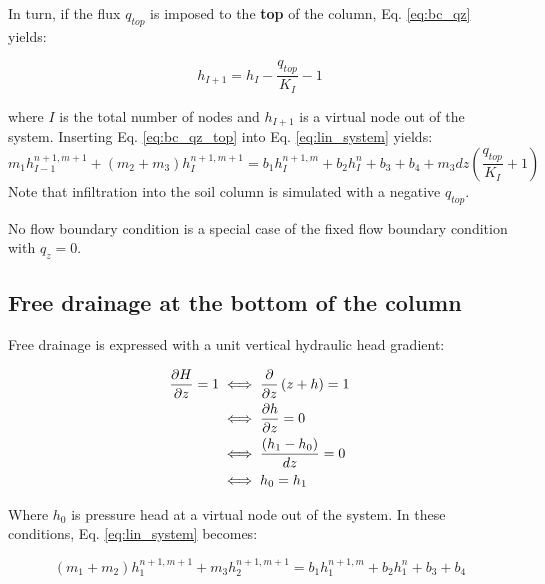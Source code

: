 \documentclass[a4paper,12pt]{article}
\begin{document}
In turn, if the flux $q_{top}$ is imposed to the \textbf{top} of the column, Eq. \ref{eq:bc_qz} yields:

\begin{equation}
    h_{I+1}  = h_I  - \frac{q_{top}}{K_I} - 1
    \label{eq:bc_qz_top}
\end{equation}

where $I$ is the total number of nodes and $h_{I+1}$ is a virtual node out of the system. Inserting Eq. \ref{eq:bc_qz_top} into Eq. \ref{eq:lin_system} yields: 
\begin{equation}
    m_1 h_{I-1}^{n+1,m+1} + (m_2 + m_3) h_I^{n+1,m+1} = b_1 h_I^{n+1,m} + b_2 h_I^n + b_3 + b_4 + m_3 dz \left( \frac{q_{top}}{K_I} +1 \right)
    \label{eq:bc_qz_lin_system_top}
\end{equation}
Note that infiltration into the soil column is simulated with a negative $q_{top}$.


No flow boundary condition is a special case of the fixed flow boundary condition with $q_z = 0$.


\subsection{Free drainage at the bottom of the column}

Free drainage is expressed with a unit vertical hydraulic head gradient: 

\begin{align}
    \frac{\partial H}{\partial z} = 1 &\iff \frac{\partial}{\partial z} \left( z + h \right) =1 \nonumber \\
				      &\iff \frac{\partial h}{\partial z} = 0 \nonumber \\
				      &\iff {\left( h_1 - h_0 \right) \over dz}  = 0 \nonumber \\
				      &\iff h_0 = h_1 
    \label{eq:bc_drain}
\end{align}

Where $h_0$ is pressure head at a virtual node out of the system. In these conditions, Eq. \ref{eq:lin_system} becomes:

\begin{equation}
    (m_1 + m_2) h_1^{n+1,m+1} + m_3 h_2^{n+1,m+1} = b_1 h_1^{n+1,m} + b_2 h_1^n + b_3 + b_4
    \label{eq:bc_drain_sys}
\end{equation}


\end{document}
